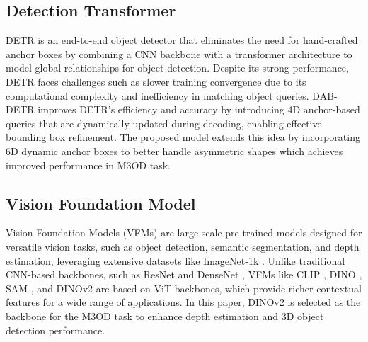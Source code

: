\subsection{Detection Transformer}
DETR\cite{carion2020end} is an end-to-end object detector that eliminates the need for hand-crafted anchor boxes by combining a CNN backbone with a transformer architecture to model global relationships for object detection. Despite its strong performance, DETR faces challenges such as slower training convergence due to its computational complexity and inefficiency in matching object queries.
DAB-DETR\cite{liu2022dab} improves DETR's efficiency and accuracy by introducing 4D anchor-based queries that are dynamically updated during decoding, enabling effective bounding box refinement. The proposed model extends this idea by incorporating 6D dynamic anchor boxes to better handle asymmetric shapes which achieves improved performance in M3OD task.

\subsection{Vision Foundation Model}
Vision Foundation Models (VFMs) are large-scale pre-trained models designed for versatile vision tasks, such as object detection, semantic segmentation, and depth estimation, leveraging extensive datasets like ImageNet-1k \cite{russakovsky2015imagenet}. Unlike traditional CNN-based backbones, such as ResNet \cite{he2016deep} and DenseNet \cite{huang2017densely}, VFMs like CLIP \cite{radford2021learning}, DINO \cite{caron2021emerging}, SAM \cite{kirillov2023segment}, and DINOv2 \cite{oquab2023dinov2} are based on ViT \cite{dosovitskiy2020image} backbones, which provide richer contextual features for a wide range of applications. In this paper, DINOv2 is selected as the backbone for the M3OD task to enhance depth estimation and 3D object detection performance.